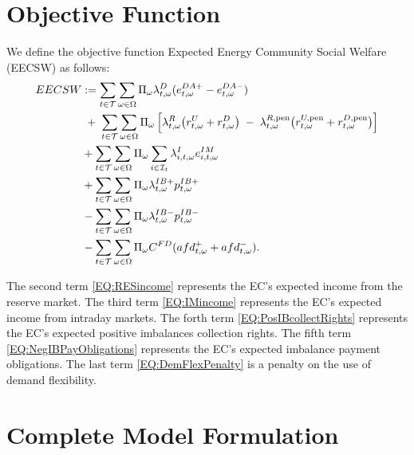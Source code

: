 \documentclass{article}
\begin{document}
\section{Objective Function}
\label{SEC:ObjectiveFunction}

We define the objective function Expected Energy Community Social Welfare (EECSW) as follows:
\begin{subequations}
	\begin{align}
    EECSW & := \sum_{t \in \mathcal{T}} \sum_{\omega \in \Omega} \Pi_{\omega} \lambda^D_{t, \omega} (e^{DA+}_{t, \omega} - e^{DA-}_{t, \omega}) \label{EQ:DAincome} \\
&\;+\;
\sum_{t \in \mathcal{T}}
\sum_{\omega \in \Omega}
    \Pi_{\omega}\,
    \Bigl[
      \lambda^{R}_{t,\omega}
        \bigl(r^{U}_{t,\omega} + r^{D}_{t,\omega}\bigr)
      \;-\;
      \lambda^{R,\text{pen}}_{t,\omega}
        \bigl(r^{U,\text{pen}}_{t,\omega} + r^{D,\text{pen}}_{t,\omega}\bigr)
    \Bigr] \label{EQ:RESincome} \\
		& + \sum_{t \in \mathcal{T}} \sum_{\omega \in \Omega} \Pi_{\omega} \sum_{i \in \mathcal{I}_t} \lambda^{I}_{i, t, \omega} e^{IM}_{i, t, \omega} \label{EQ:IMincome} \\
		& + \sum_{t \in \mathcal{T}} \sum_{\omega \in \Omega} \Pi_{\omega} \lambda^{IB+}_{t, \omega} p^{IB+}_{t, \omega} \label{EQ:PosIBcollectRights} \\
		& - \sum_{t \in \mathcal{T}} \sum_{\omega \in \Omega} \Pi_{\omega} \lambda^{IB-}_{t, \omega} p^{IB-}_{t, \omega} \label{EQ:NegIBPayObligations} \\
		& - \sum_{t \in \mathcal{T}} \sum_{\omega \in \Omega} \Pi_{\omega} C^{FD} (afd^+_{t, \omega} + afd^-_{t, \omega}). \label{EQ:DemFlexPenalty}
	\end{align}
	\label{EQ:EECSW}
\end{subequations}

The second term \eqref{EQ:RESincome} represents the EC's expected income from the reserve market. The third term \eqref{EQ:IMincome} represents the EC's expected income from intraday markets. The forth term \eqref{EQ:PosIBcollectRights} represents the EC's expected positive imbalances collection rights. The fifth term \eqref{EQ:NegIBPayObligations} represents the EC's expected imbalance payment obligations. The last term \eqref{EQ:DemFlexPenalty} is a penalty on the use of demand flexibility.

\section{Complete Model Formulation}
\label{SEC:CompleteModelFormulation}
\end{document}
